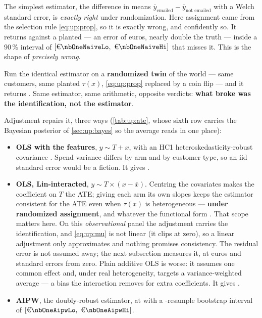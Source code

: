 The simplest estimator, the difference in means
$\bar y_{\text{emailed}} - \bar y_{\text{not emailed}}$ with a Welch standard error, is
\emph{exactly right} under randomization. Here assignment came from the selection rule
\cref{eq:up:prop}, so it is exactly wrong, and confidently so. It returns \eur{\nbOneNaiveEst}
against a planted \eur{\nbOneTrueAte} --- an error of \nbOneNaiveErr{} euros, nearly double the truth
--- inside a 90\,\% interval of $[\eur{\nbOneNaiveLo},\ \eur{\nbOneNaiveHi}]$ that misses it. This is
the shape of \emph{precisely wrong}.

Run the identical estimator on a \textbf{randomized twin} of the world --- same customers, same
planted $\tau(x)$, \cref{eq:up:prop} replaced by a coin flip --- and it returns \eur{\nbOneRctEst}.
Same estimator, same arithmetic, opposite verdicts: \textbf{what broke was the identification, not the
estimator}.

Adjustment repairs it, three ways (\cref{tab:up:ate}, whose sixth row carries the Bayesian posterior
of \cref{sec:up:bayes} so the average reads in one place):

\begin{itemize}[leftmargin=*]
  \item \textbf{OLS with the features}, $y \sim T + x$, with an HC1 heteroskedasticity-robust
        covariance \citep{white1980, mackinnon1985}. Spend variance differs by arm and by customer
        type, so an iid standard error would be a fiction. It gives \eur{\nbOneOlsEst}.
  \item \textbf{OLS, Lin-interacted}, $y \sim T \times (x - \bar x)$. Centring the covariates makes
        the coefficient on $T$ the ATE; giving each arm its own slopes keeps the estimator consistent
        for the ATE even when $\tau(x)$ is heterogeneous --- \textbf{under randomized assignment}, and
        whatever the functional form \citep{lin2013}. That scope matters here. On this
        \emph{observational} panel the adjustment carries the identification, and \cref{eq:up:mu} is
        not linear (it clips at zero), so a linear adjustment only approximates and nothing promises
        consistency. The residual error is not assumed away; the next subsection measures it, at
        \nbOneLinPanelBias{} euros and \nbOneLinPanelSes{} standard errors from zero. Plain additive
        OLS is worse: it assumes one common effect and, under real heterogeneity, targets a
        variance-weighted average --- a bias the interaction removes for \nbOneNFeatures{} extra
        coefficients. It gives \eur{\nbOneLinEst}.
  \item \textbf{AIPW}, the doubly-robust estimator, at \eur{\nbOneAipwEst} with a
        \nbOneNBootAipw-resample bootstrap interval of
        $[\eur{\nbOneAipwLo},\ \eur{\nbOneAipwHi}]$.
\end{itemize}

